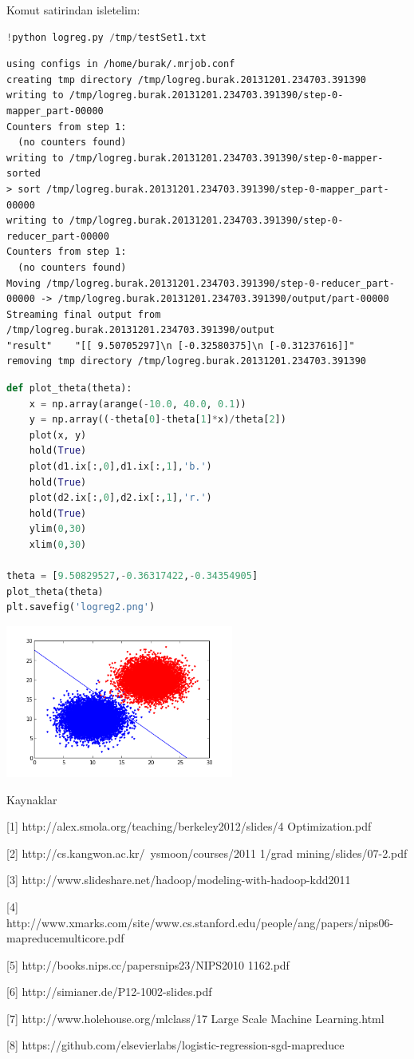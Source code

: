 \documentclass[12pt,fleqn]{article}\usepackage{../common}
\begin{document}
Komut satirindan isletelim:

\begin{lstlisting}[language=Python]
!python logreg.py /tmp/testSet1.txt 
\end{lstlisting}

\begin{verbatim}
using configs in /home/burak/.mrjob.conf
creating tmp directory /tmp/logreg.burak.20131201.234703.391390
writing to /tmp/logreg.burak.20131201.234703.391390/step-0-mapper_part-00000
Counters from step 1:
  (no counters found)
writing to /tmp/logreg.burak.20131201.234703.391390/step-0-mapper-sorted
> sort /tmp/logreg.burak.20131201.234703.391390/step-0-mapper_part-00000
writing to /tmp/logreg.burak.20131201.234703.391390/step-0-reducer_part-00000
Counters from step 1:
  (no counters found)
Moving /tmp/logreg.burak.20131201.234703.391390/step-0-reducer_part-00000 -> /tmp/logreg.burak.20131201.234703.391390/output/part-00000
Streaming final output from /tmp/logreg.burak.20131201.234703.391390/output
"result"	"[[ 9.50705297]\n [-0.32580375]\n [-0.31237616]]"
removing tmp directory /tmp/logreg.burak.20131201.234703.391390
\end{verbatim}

\begin{lstlisting}[language=Python]
def plot_theta(theta):
    x = np.array(arange(-10.0, 40.0, 0.1))
    y = np.array((-theta[0]-theta[1]*x)/theta[2])
    plot(x, y)
    hold(True)
    plot(d1.ix[:,0],d1.ix[:,1],'b.')
    hold(True)
    plot(d2.ix[:,0],d2.ix[:,1],'r.')
    hold(True)
    ylim(0,30)
    xlim(0,30)

theta = [9.50829527,-0.36317422,-0.34354905]
plot_theta(theta)
plt.savefig('logreg2.png')
\end{lstlisting}

\includegraphics[height=5cm]{logreg2.png}

Kaynaklar

[1] http://alex.smola.org/teaching/berkeley2012/slides/4 Optimization.pdf

[2] http://cs.kangwon.ac.kr/~ysmoon/courses/2011 1/grad mining/slides/07-2.pdf

[3] http://www.slideshare.net/hadoop/modeling-with-hadoop-kdd2011

[4] http://www.xmarks.com/site/www.cs.stanford.edu/people/ang/papers/nips06-mapreducemulticore.pdf

[5] http://books.nips.cc/papersnips23/NIPS2010 1162.pdf

[6] http://simianer.de/P12-1002-slides.pdf

[7] http://www.holehouse.org/mlclass/17 Large Scale Machine Learning.html

[8] https://github.com/elsevierlabs/logistic-regression-sgd-mapreduce
\end{document}
